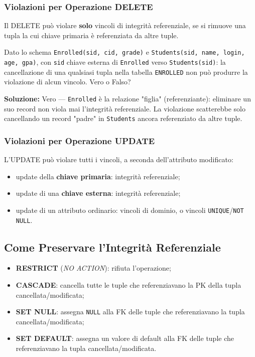 \documentclass[12pt, a4paper]{article}
\begin{document}
\subsubsection{Violazioni per Operazione DELETE}

Il DELETE può violare \textbf{solo} vincoli di integrità referenziale, se si rimuove una tupla la cui chiave primaria è referenziata da altre tuple.

\begin{tcolorbox}[colback=lightergray!10, colframe=tocsec, title=\textbf{Esercizio 3}]
Dato lo schema \texttt{Enrolled(sid, cid, grade)} e \texttt{Students(sid, name, login, age, gpa)}, con \texttt{sid} chiave esterna di \texttt{Enrolled} verso \texttt{Students(sid)}: la cancellazione di una qualsiasi tupla nella tabella \texttt{ENROLLED} non può produrre la violazione di alcun vincolo. Vero o Falso?
\end{tcolorbox}
\textbf{Soluzione:} Vero — \texttt{Enrolled} è la relazione "figlia" (referenziante): eliminare un suo record non viola mai l'integrità referenziale. La violazione scatterebbe solo cancellando un record "padre" in \texttt{Students} ancora referenziato da altre tuple.

\subsubsection{Violazioni per Operazione UPDATE}

L'UPDATE può violare tutti i vincoli, a seconda dell'attributo modificato:
\begin{itemize}
    \item update della \textbf{chiave primaria}: integrità referenziale;
    \item update di una \textbf{chiave esterna}: integrità referenziale;
    \item update di un attributo ordinario: vincoli di dominio, o vincoli \texttt{UNIQUE}/\texttt{NOT NULL}.
\end{itemize}

\subsection{Come Preservare l'Integrità Referenziale}

\begin{itemize}
    \item \textbf{RESTRICT} (\textit{NO ACTION}): rifiuta l'operazione;
    \item \textbf{CASCADE}: cancella tutte le tuple che referenziavano la PK della tupla cancellata/modificata;
    \item \textbf{SET NULL}: assegna \texttt{NULL} alla FK delle tuple che referenziavano la tupla cancellata/modificata;
    \item \textbf{SET DEFAULT}: assegna un valore di default alla FK delle tuple che referenziavano la tupla cancellata/modificata.
\end{itemize}
\end{document}
